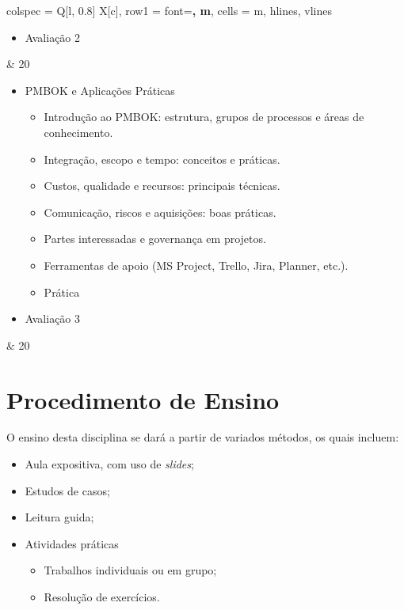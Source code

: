 \documentclass[a4paper, 12pt]{article}
\begin{document}
\begin{longtblr}{colspec = {Q[l, 0.8\textwidth] X[c]},
        row{1} = {font=\bfseries, m},
        cells = {m},
        hlines, vlines
        }
\begin{itemize}
\begin{itemize}
                \item Prática
            \end{itemize}
        \item Avaliação 2
    \end{itemize} & 20\\
    \begin{itemize}
        \item PMBOK e Aplicações Práticas
            \begin{itemize}
                \item Introdução ao PMBOK: estrutura, grupos de processos e áreas de conhecimento.
                \item Integração, escopo e tempo: conceitos e práticas.
                \item Custos, qualidade e recursos: principais técnicas.
                \item Comunicação, riscos e aquisições: boas práticas.
                \item Partes interessadas e governança em projetos.
                \item Ferramentas de apoio (MS Project, Trello, Jira, Planner, etc.).
                \item Prática
            \end{itemize}
        \item Avaliação 3
    \end{itemize} & 20\\
\end{longtblr}

\section{Procedimento de Ensino}

O ensino desta disciplina se dará a partir de variados métodos, os quais incluem: 
\begin{itemize}
    \item Aula expositiva, com uso de \textit{slides};
    \item Estudos de casos;
    \item Leitura guida;
    \item Atividades práticas
        \begin{itemize}
            \item Trabalhos individuais ou em grupo;
            \item Resolução de exercícios.
        \end{itemize}
\end{itemize}
\end{document}
